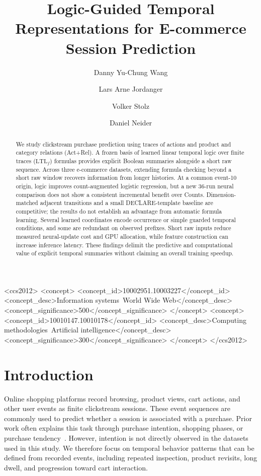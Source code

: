\documentclass[sigconf,anonymous,nonacm]{acmart}
\title{Logic-Guided Temporal Representations for E-commerce Session Prediction}
\author{Danny Yu-Chung Wang}
\affiliation{%
  \institution{Western Norway University of Applied Sciences}
  \city{Bergen}
  \country{Norway}
}
\author{Lars Arne Jordanger}
\affiliation{%
  \institution{Western Norway University of Applied Sciences}
  \city{Bergen}
  \country{Norway}
}
\author{Volker Stolz}
\affiliation{%
  \institution{Western Norway University of Applied Sciences}
  \city{Bergen}
  \country{Norway}
}
\author{Daniel Neider}
\affiliation{%
  \institution{Department of Computer Science, TU Dortmund University}
  \city{Dortmund}
  \country{Germany}
}
\newif\ifrevisions
\newcommand{\rev}[1]{\ifrevisions\textcolor{red}{#1}\else#1\fi}
\begin{document}
\begin{abstract}
\rev{We study clickstream purchase prediction using traces of actions and product and category relations (Act+Rel). A frozen basis of learned linear temporal logic over finite traces ($\mathrm{LTL}_f$) formulas provides explicit Boolean summaries alongside a short raw sequence. Across three e-commerce datasets, extending formula checking beyond a short raw window recovers information from longer histories. At a common event-10 origin, logic improves count-augmented logistic regression, but a new 36-run neural comparison does not show a consistent incremental benefit over Counts. Dimension-matched adjacent transitions and a small DECLARE-template baseline are competitive; the results do not establish an advantage from automatic formula learning. Several learned coordinates encode occurrence or simple guarded temporal conditions, and some are redundant on observed prefixes. Short raw inputs reduce measured neural-update cost and GPU allocation, while feature construction can increase inference latency. These findings delimit the predictive and computational value of explicit temporal summaries without claiming an overall training speedup.}
\end{abstract}

\begin{CCSXML}
<ccs2012>
 <concept>
  <concept_id>10002951.10003227</concept_id>
  <concept_desc>Information systems~World Wide Web</concept_desc>
  <concept_significance>500</concept_significance>
 </concept>
 <concept>
  <concept_id>10010147.10010178</concept_id>
  <concept_desc>Computing methodologies~Artificial intelligence</concept_desc>
  <concept_significance>300</concept_significance>
 </concept>
</ccs2012>
\end{CCSXML}


\maketitle

\section{Introduction}
Online shopping platforms record browsing, product views, cart actions, and other user events as finite clickstream sessions. These event sequences are commonly used to predict whether a session is associated with a purchase. Prior work often explains this task through purchase intention, shopping phases, or purchase tendency~\cite{requena2020shopper,hatt2020early,ozyurt2022deep}. However, intention is not directly observed in the datasets used in this study. We therefore focus on temporal behavior patterns that can be defined from recorded events, including repeated inspection, product revisits, long dwell, and progression toward cart interaction.
\end{document}
